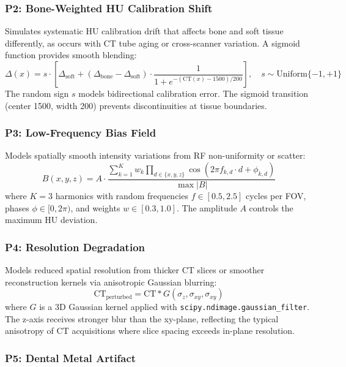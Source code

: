 \documentclass[11pt,a4paper]{article}
\begin{document}
\subsubsection{P2: Bone-Weighted HU Calibration Shift}

Simulates systematic HU calibration drift that affects bone and soft tissue differently, as occurs with CT tube aging or cross-scanner variation. A sigmoid function provides smooth blending:
\begin{equation}
\Delta(x) = s \cdot \left[\Delta_\text{soft} + (\Delta_\text{bone} - \Delta_\text{soft}) \cdot \frac{1}{1 + e^{-(\text{CT}(x)-1500)/200}}\right], \quad s \sim \text{Uniform}\{-1, +1\}
\end{equation}
The random sign $s$ models bidirectional calibration error. The sigmoid transition (center 1500, width 200) prevents discontinuities at tissue boundaries.

\subsubsection{P3: Low-Frequency Bias Field}

Models spatially smooth intensity variations from RF non-uniformity or scatter:
\begin{equation}
B(x,y,z) = A \cdot \frac{\sum_{k=1}^{K} w_k \prod_{d \in \{x,y,z\}} \cos(2\pi f_{k,d} \cdot d + \phi_{k,d})}{\max|B|}
\end{equation}
where $K=3$ harmonics with random frequencies $f \in [0.5, 2.5]$ cycles per FOV, phases $\phi \in [0, 2\pi)$, and weights $w \in [0.3, 1.0]$. The amplitude $A$ controls the maximum HU deviation.

\subsubsection{P4: Resolution Degradation}

Models reduced spatial resolution from thicker CT slices or smoother reconstruction kernels via anisotropic Gaussian blurring:
\begin{equation}
\text{CT}_\text{perturbed} = \text{CT} * G(\sigma_z, \sigma_{xy}, \sigma_{xy})
\end{equation}
where $G$ is a 3D Gaussian kernel applied with \texttt{scipy.ndimage.gaussian\_filter}. The z-axis receives stronger blur than the xy-plane, reflecting the typical anisotropy of CT acquisitions where slice spacing exceeds in-plane resolution.

\subsubsection{P5: Dental Metal Artifact}
\end{document}
